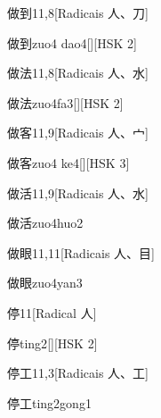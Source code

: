 \begin{entry}{做到}{11,8}[Radicais ⼈、⼑]
  \begin{phonetics}{做到}{zuo4 dao4}[][HSK 2]
  \end{phonetics}
\end{entry}

\begin{entry}{做法}{11,8}[Radicais ⼈、⽔]
  \begin{phonetics}{做法}{zuo4fa3}[][HSK 2]
  \end{phonetics}
\end{entry}

\begin{entry}{做客}{11,9}[Radicais ⼈、⼧]
  \begin{phonetics}{做客}{zuo4 ke4}[][HSK 3]
  \end{phonetics}
\end{entry}

\begin{entry}{做活}{11,9}[Radicais ⼈、⽔]
  \begin{phonetics}{做活}{zuo4huo2}
  \end{phonetics}
\end{entry}

\begin{entry}{做眼}{11,11}[Radicais ⼈、⽬]
  \begin{phonetics}{做眼}{zuo4yan3}
  \end{phonetics}
\end{entry}

\begin{entry}{停}{11}[Radical ⼈]
  \begin{phonetics}{停}{ting2}[][HSK 2]
  \end{phonetics}
\end{entry}

\begin{entry}{停工}{11,3}[Radicais ⼈、⼯]
  \begin{phonetics}{停工}{ting2gong1}
  \end{phonetics}
\end{entry}


